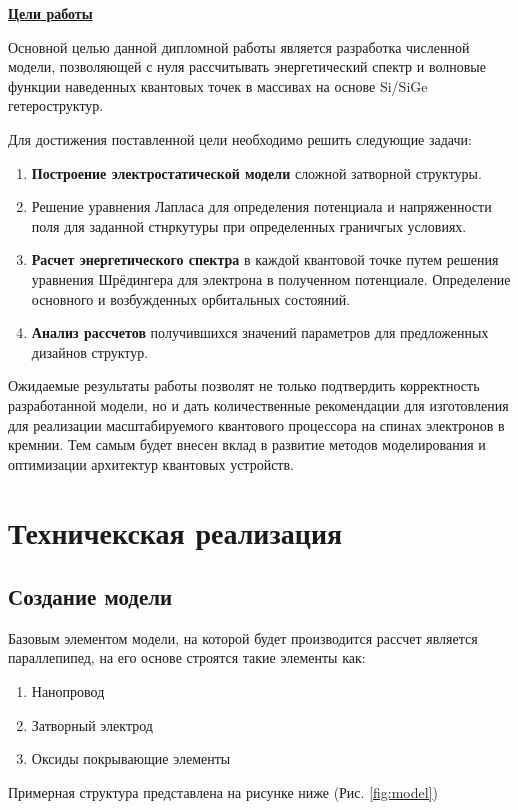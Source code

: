 \documentclass[a4paper,14pt]{extreport} %
\begin{document}
\textbf{\underline{Цели работы}}


Основной целью данной дипломной работы является разработка численной модели, позволяющей с нуля рассчитывать энергетический спектр и волновые функции наведенных квантовых точек в массивах на основе Si/SiGe гетероструктур.

Для достижения поставленной цели необходимо решить следующие задачи:
\begin{enumerate}
    \item \textbf{Построение электростатической модели} сложной затворной структуры.
    \item Решение уравнения Лапласа для определения потенциала и напряженности поля для заданной стнркутуры при определенных граничгых условиях.
    \item \textbf{Расчет энергетического спектра} в каждой квантовой точке путем решения уравнения Шрёдингера для электрона в полученном потенциале. Определение основного и возбужденных орбитальных состояний.
    \item \textbf{Анализ рассчетов} получившихся значений параметров для предложенных дизайнов структур.
\end{enumerate}

Ожидаемые результаты работы позволят не только подтвердить корректность разработанной модели, но и дать количественные рекомендации для изготовления для реализации масштабируемого квантового процессора на спинах электронов в кремнии. Тем самым будет внесен вклад в развитие методов моделирования и оптимизации архитектур квантовых устройств.

\chapter{Техничекская реализация}
\section{Создание модели}
Базовым элементом модели, на которой будет производится рассчет является параллепипед, на его основе строятся такие элементы как:
\begin{enumerate}
    \item Нанопровод
    \item Затворный электрод
    \item Оксиды покрывающие элементы
\end{enumerate}

Примерная структура представлена на рисунке ниже (Рис. \ref{fig:model})
\end{document}
